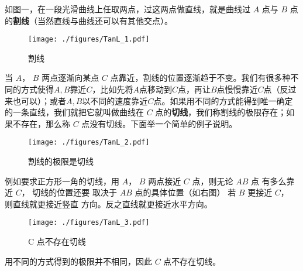 


如图一，在一段光滑曲线上任取两点，过这两点做直线，就是曲线过 $A$ 点与 $B$ 点的\textbf{割线}（当然直线与曲线还可以有其他交点）。
\begin{figure}[ht]
\centering
\texttt{[image: ./figures/TanL\_1.pdf]}
\caption{割线} \label{TanL_fig1}
\end{figure}

当 $A$，  $B$ 两点逐渐向某点 $C$ 点靠近，割线的位置逐渐趋于不变。我们有很多种不同的方式使得$A, B$靠近$C$，比如先将$A$点移动到$C$点，再让$B$点慢慢靠近$C$点（反过来也可以）；或者$A, B$以不同的速度靠近$C$点。如果用不同的方式能得到唯一确定的一条直线，我们就把它就叫做曲线在 $C$ 点的\textbf{切线}，我们称割线的极限存在；如果不存在，那么称 $C$ 点没有切线。下面举一个简单的例子说明。

\begin{figure}[ht]
\vskip 0pt
\centering
\texttt{[image: ./figures/TanL\_2.pdf]}
\caption{割线的极限是切线} \label{TanL_fig2}
\end{figure}
例如要求正方形一角的切线，用
 $A$，  $B$ 两点接近 $C$ 点，则无论 $AB$ 点
有多么靠近 $C$， 切线的位置还要
取决于 $AB$ 点的具体位置（如右图）
若 $B$ 更接近 $C$， 则直线就更接近竖直
方向。反之直线就更接近水平方向。

\begin{figure}[ht]
\centering
\texttt{[image: ./figures/TanL\_3.pdf]}
\caption{C 点不存在切线} \label{TanL_fig3}
\end{figure}

用不同的方式得到的极限并不相同，因此 $C$ 点不存在切线。

